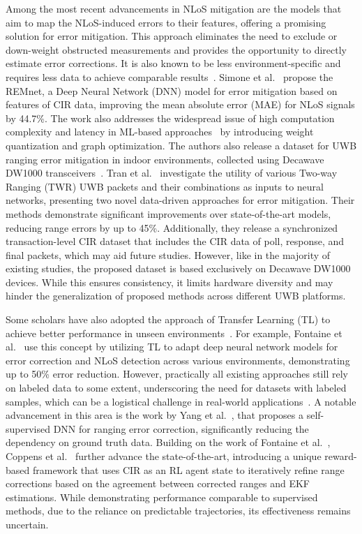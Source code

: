 Among the most recent advancements in NLoS mitigation are the models that aim to map the NLoS-induced errors to their features, offering a promising solution for error mitigation. This approach eliminates the need to exclude or down-weight obstructed measurements and provides the opportunity to directly estimate error corrections. It is also known to be less environment-specific and requires less data to achieve comparable results~\cite{savic2015kernel, Simone2021UWB, Kim2023NLOS}. Simone et al.~\cite{Simone2021UWB} propose the REMnet, a Deep Neural Network (DNN) model for error mitigation based on features of CIR data, improving the mean absolute error (MAE) for NLoS signals by 44.7\%. The work also addresses the widespread issue of high computation complexity and latency in ML-based approaches~\cite{Zeng2018NLOS} by introducing weight quantization and graph optimization. The authors also release a dataset for UWB ranging error mitigation in indoor environments, collected using Decawave DW1000 transceivers~\cite{simone_angarano_2020_4399187}. Tran et al.~\cite{Tran2022UWB} investigate the utility of various Two-way Ranging (TWR) UWB packets and their combinations as inputs to neural networks, presenting two novel data-driven approaches for error mitigation. Their methods demonstrate significant improvements over state-of-the-art models, reducing range errors by up to 45\%. Additionally, they release a synchronized transaction-level CIR dataset that includes the CIR data of poll, response, and final packets, which may aid future studies. However, like in the majority of existing studies, the proposed dataset is based exclusively on Decawave DW1000 devices. While this ensures consistency, it limits hardware diversity and may hinder the generalization of proposed methods across different UWB platforms.

Some scholars have also adopted the approach of Transfer Learning (TL) to achieve better performance in unseen environments~\cite{fontaine2023transfer, li2023unsupervised}. For example, Fontaine et al.~\cite{fontaine2023transfer} use this concept by utilizing TL to adapt deep neural network models for error correction and NLoS detection across various environments, demonstrating up to 50\% error reduction. However, practically all existing approaches still rely on labeled data to some extent, underscoring the need for datasets with labeled samples, which can be a logistical challenge in real-world applications~\cite{coppens2024removing}. A notable advancement in this area is the work by Yang et al.~\cite{yang2023self}, that proposes a self-supervised DNN for ranging error correction, significantly reducing the dependency on ground truth data. Building on the work of Fontaine et al.~\cite{fontaine2023transfer}, Coppens et al.~\cite{coppens2024removing} further advance the state-of-the-art, introducing a unique reward-based framework that uses CIR as an RL agent state to iteratively refine range corrections based on the agreement between corrected ranges and EKF estimations. While demonstrating performance comparable to supervised methods, due to the reliance on predictable trajectories, its effectiveness remains uncertain.

